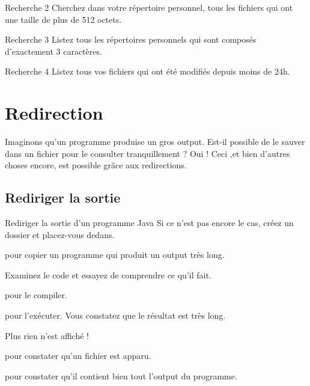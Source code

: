 \documentclass[a4paper,11pt]{style-esi/td}
\begin{document}
	\begin{Exercice}{Recherche 2}
		Cherchez dans votre répertoire personnel,
		tous les fichiers qui ont une taille de plus de 512 octets.
	\end{Exercice}

	\begin{Exercice}{Recherche 3}
		Listez tous les répertoires personnels 
		qui sont composés d'exactement 3 caractères.
	\end{Exercice}

	\begin{Exercice}{Recherche 4}
		Listez tous vos fichiers qui ont été modifiés depuis moins de 24h.
	\end{Exercice}

\newpage

\section{Redirection}

	Imaginons qu'un programme  produise un gros output.
	Est-il possible de le sauver dans un fichier pour le consulter tranquillement ?
	Oui !
	Ceci ,et bien d'autres choses encore, est possible grâce aux redirections.

	\subsection{Rediriger la sortie}

		\begin{Experience}{Rediriger la sortie d'un programme Java}
			Si ce n'est pas encore le cas,
			créez un dossier  et placez-vous dedans.
			\begin{steps}
			\item 
				pour copier un programme  qui produit un output très long.
			\item 
				Examinez le code et essayez de comprendre ce qu'il fait.
			\item 
				 pour le compiler.
			\item 
				 pour l'exécuter.
				Vous constatez que le résultat est très long.
			\item 
				 Plus rien n'est affiché !
			\item 
				 pour constater qu'un fichier  est apparu.
			\item 
				pour constater qu'il contient bien tout l'output du programme.
			\end{steps}
		\end{Experience}
\end{document}
